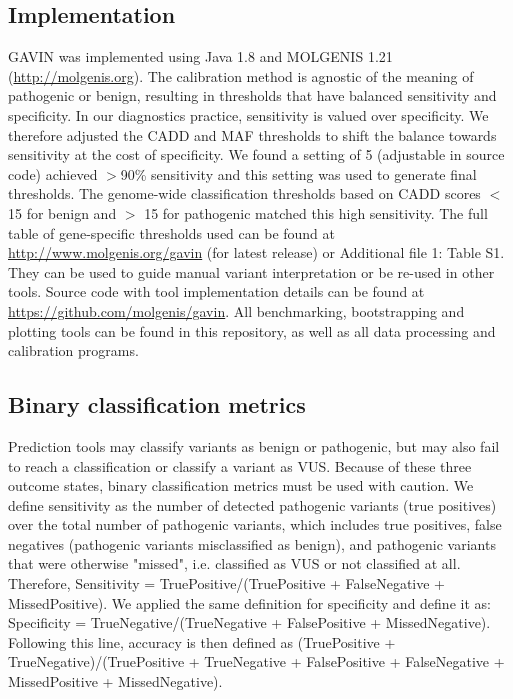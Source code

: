 \subsection{Implementation}
GAVIN was implemented using Java 1.8 and MOLGENIS\cite{Swertz_2010a} 1.21 (\url{http://molgenis.org}).
The calibration method is agnostic of the meaning of pathogenic or benign, resulting in thresholds that have balanced sensitivity and specificity.
In our diagnostics practice, sensitivity is valued over specificity.
We therefore adjusted the CADD and MAF thresholds to shift the balance towards sensitivity at the cost of specificity.
We found a setting of 5 (adjustable in source code) achieved $>$90\% sensitivity and this setting was used to generate final thresholds.
The genome-wide classification thresholds based on CADD scores $<$ 15 for benign and $>$ 15 for pathogenic matched this high sensitivity.
The full table of gene-specific thresholds used can be found at \url{http://www.molgenis.org/gavin} (for latest release) or Additional file 1: Table S1.
They can be used to guide manual variant interpretation or be re-used in other tools.
Source code with tool implementation details can be found at \url{https://github.com/molgenis/gavin}.
All benchmarking, bootstrapping and plotting tools can be found in this repository, as well as all data processing and calibration programs.

\subsection{Binary classification metrics}
Prediction tools may classify variants as benign or pathogenic, but may also fail to reach a classification or classify a variant as VUS.
Because of these three outcome states, binary classification metrics must be used with caution.
We define sensitivity as the number of detected pathogenic variants (true positives) over the total number of pathogenic variants, which includes true positives, false negatives (pathogenic variants misclassified as benign), and pathogenic variants that were otherwise "missed", i.e. classified as VUS or not classified at all.
Therefore, Sensitivity = TruePositive/(TruePositive + FalseNegative + MissedPositive).
We applied the same definition for specificity and define it as: Specificity = TrueNegative/(TrueNegative + FalsePositive + MissedNegative).
Following this line, accuracy is then defined as (TruePositive + TrueNegative)/(TruePositive + TrueNegative + FalsePositive + FalseNegative + MissedPositive + MissedNegative).

